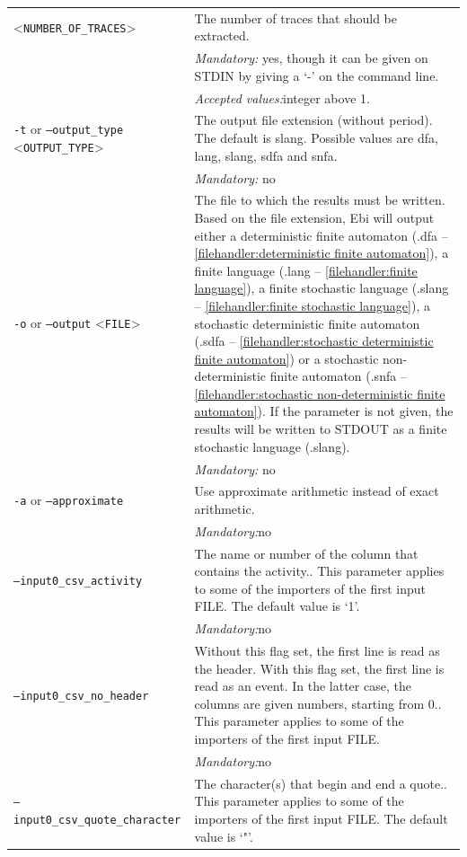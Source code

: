 {\begin{tabularx}{\linewidth}{lX}
<\texttt{NUMBER\_OF\_TRACES}>&The number of traces that should be extracted.\\
&\textit{Mandatory:} \quad yes, though it can be given on STDIN by giving a `-' on the command line.\\
&\textit{Accepted values:}\quad integer above 1.\\
\texttt{-t} or \texttt{--output\_type} <\texttt{OUTPUT\_TYPE}> &
The output file extension (without period). The default is slang. Possible values are dfa, lang, slang, sdfa and snfa.\\
&\textit{Mandatory:} \quad no\\
\texttt{-o} or \texttt{--output} <\texttt{FILE}> &
The file to which the results must be written. Based on the file extension, Ebi will output either a deterministic finite automaton (.dfa -- \cref{filehandler:deterministic finite automaton}), a finite language (.lang -- \cref{filehandler:finite language}), a finite stochastic language (.slang -- \cref{filehandler:finite stochastic language}), a stochastic deterministic finite automaton (.sdfa -- \cref{filehandler:stochastic deterministic finite automaton}) or a stochastic non-deterministic finite automaton (.snfa -- \cref{filehandler:stochastic non-deterministic finite automaton}).
If the parameter is not given, the results will be written to STDOUT as a finite stochastic language (.slang).\\
&\textit{Mandatory:} \quad no\\
\texttt{-a} or \texttt{--approximate} & Use approximate arithmetic instead of exact arithmetic.\\
&\textit{Mandatory:}\quad no\\
\texttt{--input0\_csv\_activity} & The name or number of the column that contains the activity.. This parameter applies to some of the importers of the first input FILE. The default value is `1'.\\
&\textit{Mandatory:}\quad no\\
\texttt{--input0\_csv\_no\_header} & Without this flag set, the first line is read as the header. 
    With this flag set, the first line is read as an event. In the latter case, the columns are given numbers, starting from 0.. This parameter applies to some of the importers of the first input FILE. \\
&\textit{Mandatory:}\quad no\\
\texttt{--input0\_csv\_quote\_character} & The character(s) that begin and end a quote.. This parameter applies to some of the importers of the first input FILE. The default value is `"'.\\

\end{tabularx}}
